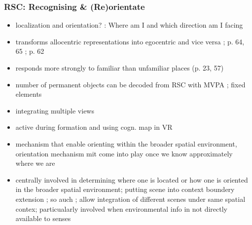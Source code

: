 \documentclass[10pt,a4paper,twocolumn]{article}
\begin{document}
\subsubsection{RSC: Recognising \& (Re)orientate}
\begin{itemize}
	\item localization and orientation? \citet{epstein_2014_landmark-based_wayfinding}:
	Where am I and which direction am I facing
	\item transforms allocentric representations into egocentric and vice versa
	\citep{vann_2009_what_does_retrospenical_cortex}; p. 64, 65 \citet{epstein_2008_parahippocampal_retrospinal_navigation};
	p. 62 \citet{epstein_2014_landmark-based_wayfinding}
	\item responds more strongly to familiar than unfamiliar places (p. 23,
	57)
	\item number of permanent objects can be decoded from RSC with MVPA \citep{auger_2013_assessing_retrosplenial_navigators};
	fixed elements \citep{marchette_2014_anchoring_neural_compass}
	\item integrating multiple views \citep{park_2010_refreshing_visual_scenes}
	\item active during formation and using cogn. map in VR \citep{iaria_2007_retrosplenial_hippocampal_navigation}
	\item mechanism that enable orienting within the broader spatial environment,
	orientation mechanism mit come into play once we know approximately
	where we are
	\item centrally involved in determining where one is located or how one
	is oriented in the broader spatial environment; putting scene into
	context boundery extension \citep{epstein_2014_landmark-based_wayfinding};
	so auch \citet{galati_2010_reference_frames_spatial_perception};
	allow integration of different scenes under same spatial contex; particualarly
	involved when environmental info in not directly available to senses
\end{itemize}
\end{document}
